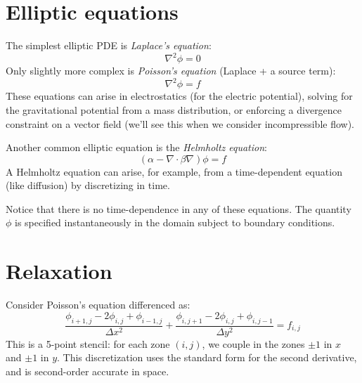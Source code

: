 \label{ch:multigrid}

\begin{quote}
\end{quote}

\section{Elliptic equations}

The simplest elliptic PDE is {\em Laplace's equation}:
\begin{equation}
\nabla^2 \phi = 0
\end{equation}
Only slightly more complex is {\em Poisson's equation} (Laplace + a source term):
\begin{equation}
\nabla^2 \phi = f
\end{equation}
These equations can arise in electrostatics (for the electric potential),
solving for the gravitational potential from a mass distribution, or
enforcing a divergence constraint on a vector field (we'll see this
when we consider incompressible flow).

Another common elliptic equation is the {\em Helmholtz equation}:
\begin{equation}
(\alpha - \nabla \cdot \beta \nabla) \phi = f
\end{equation}
A Helmholtz equation can arise, for example, from a time-dependent
equation (like diffusion) by discretizing in time.

Notice that there is no time-dependence in any of these equations.
The quantity $\phi$ is specified instantaneously in the domain subject to
boundary conditions.


\section{Relaxation}

Consider Poisson's equation differenced as:
\begin{equation}
\frac{\phi_{i+1,j} - 2 \phi_{i,j} + \phi_{i-1,j}}{\Delta x^2} +
\frac{\phi_{i,j+1} - 2 \phi_{i,j} + \phi_{i,j-1}}{\Delta y^2} = f_{i,j}
\end{equation}
This is a 5-point stencil: for each zone $(i,j)$, we couple in the
zones $\pm 1$ in $x$ and $\pm 1$ in $y$.  This discretization uses
the standard form for the second derivative, and is second-order
accurate in space.  

